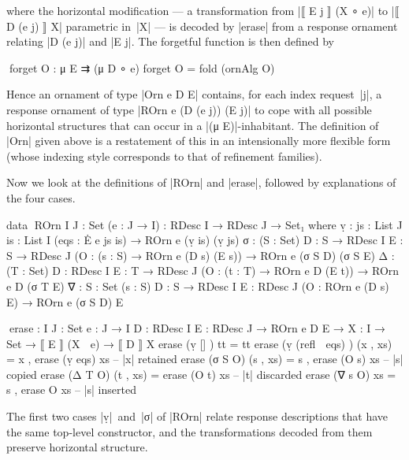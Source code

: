 where the horizontal modification --- a transformation from |⟦ E j ⟧ (X ∘ e)| to |⟦ D (e j) ⟧ X| parametric in~|X| --- is decoded by |erase| from a response ornament relating |D (e j)| and |E j|.
The forgetful function is then defined by
\begin{code}
^^^forget O : μ E ⇉ (μ D ∘ e)
forget O = fold (ornAlg O)
\end{code}
Hence an ornament of type |Orn e D E| contains, for each index request~|j|, a response ornament of type |ROrn e (D (e j)) (E j)| to cope with all possible horizontal structures that can occur in a |(μ E)|-inhabitant.
The definition of |Orn| given above is a restatement of this in an intensionally more flexible form (whose indexing style corresponds to that of refinement families).

Now we look at the definitions of |ROrn| and |erase|, followed by explanations of the four cases.
\begin{code}
data ^^^ROrn {I J : Set} (e : J → I) : RDesc I → RDesc J → Set₁ where
  ṿ   :  {js : List J} {is : List I} (eqs : Ė e js is) → ROrn e (ṿ is) (ṿ js)
  σ   :  (S : Set) {D : S → RDesc I} {E : S → RDesc J}
         (O : (s : S) → ROrn e (D s) (E s)) → ROrn e (σ S D) (σ S E)
  Δ   :  (T : Set) {D : RDesc I} {E : T → RDesc J}
         (O : (t : T) → ROrn e D (E t)) → ROrn e D (σ T E)
  ∇   :  {S : Set} (s : S) {D : S → RDesc I} {E : RDesc J}
         (O : ROrn e (D s) E) → ROrn e (σ S D) E
           
^^^erase :  {I J : Set} {e : J → I} {D : RDesc I} {E : RDesc J} →
            ROrn e D E → {X : I → Set} → ⟦ E ⟧ (X ∘ e) → ⟦ D ⟧ X
erase (ṿ []            )  tt         = tt
erase (ṿ (refl ∷ eqs)  )  (x ,  xs)  = x  ,  erase (ṿ eqs)  xs  -- |x| retained
erase (σ S O)             (s ,  xs)  = s  ,  erase (O s)    xs  -- |s| copied
erase (Δ T O)             (t ,  xs)  =       erase (O t)    xs  -- |t| discarded
erase (∇ s O)                   xs   = s  ,  erase O        xs  -- |s| inserted
\end{code}
The first two cases |ṿ|~and~|σ| of |ROrn| relate response descriptions that have the same top-level constructor, and the transformations decoded from them preserve horizontal structure.
